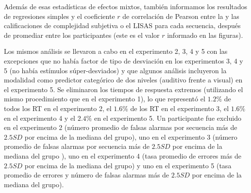 
Además de esas estadísticas de efectos mixtos, también informamos los resultados de regresiones simples y el coeficiente $r$ de correlación de Pearson entre la \mdlbin y las calificaciones de complejidad subjetiva o el LISAS para cada secuencia, después de promediar entre los participantes (este es el valor $r$ informado en las figuras). %


Los mismos análisis se llevaron a cabo en el experimento 2, 3, 4 y 5 con las excepciones que no había factor de tipo de desviación en los experimentos 3, 4 y 5 (no había estímulos súper-desviados) y que algunos análisis incluyeron la modalidad como predictor categórico de dos niveles (auditivo frente a visual) en el experimento 5. Se eliminaron los tiempos de respuesta extremos (utilizando el mismo procedimiento que en el experimento 1), lo que representó el $1.2\%$ de todos los RT en el experimento 2, el $1.6\%$ de los RT en el experimento 3, el $1.6\%$ en el experimento 4 y el $2.4\%$ en el experimento 5. Un participante fue excluido en el experimento 2 (número promedio de falsas alarmas por secuencia más de $2.5 SD$ por encima de la mediana del grupo), uno en el experimento 3 (número promedio de falsas alarmas por secuencia más de $2.5 SD$ por encima de la mediana del grupo ), uno en el experimento 4 (tasa promedio de errores más de $2.5 SD$ por encima de la mediana del grupo) y uno en el experimento 5 (tasa promedio de errores y número de falsas alarmas más de $2.5 SD$ por encima de la mediana del grupo).

